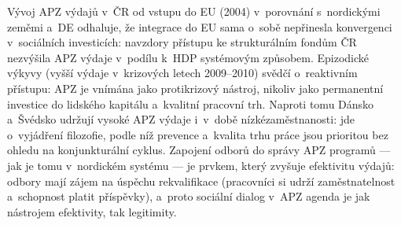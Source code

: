 Vývoj \ac{APZ} výdajů v~ČR od vstupu do \ac{EU} (2004) v~porovnání s~nordickými zeměmi a~DE odhaluje, že integrace do \ac{EU} sama o~sobě nepřinesla konvergenci v~sociálních investicích: navzdory přístupu ke strukturálním fondům ČR nezvýšila \ac{APZ} výdaje v~podílu k~\ac{HDP} systémovým způsobem.
Epizodické výkyvy (vyšší výdaje v~krizových letech 2009--2010) svědčí o~reaktivním přístupu: \ac{APZ} je vnímána jako protikrizový nástroj, nikoliv jako permanentní investice do lidského kapitálu a~kvalitní pracovní trh.
Naproti tomu Dánsko a~Švédsko udržují vysoké \ac{APZ} výdaje i~v~době nízkézaměstnanosti: jde o~vyjádření filozofie, podle níž prevence a~kvalita trhu práce jsou prioritou bez ohledu na konjunkturální cyklus.
Zapojení odborů do správy \ac{APZ} programů --- jak je tomu v~nordickém systému --- je prvkem, který zvyšuje efektivitu výdajů: odbory mají zájem na úspěchu rekvalifikace (pracovníci si udrží zaměstnatelnost a~schopnost platit příspěvky), a~proto sociální dialog v~\ac{APZ} agenda je jak nástrojem efektivity, tak legitimity.


